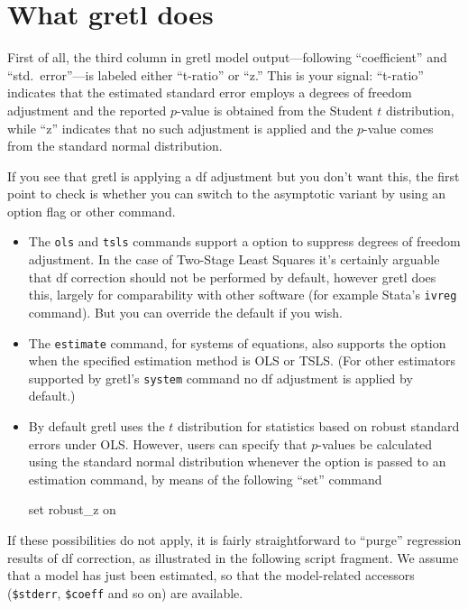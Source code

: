 \section{What gretl does}
\label{sec:df-policy}

First of all, the third column in gretl model output---following
``coefficient'' and ``std.\ error''---is labeled either ``t-ratio'' or
``z.'' This is your signal: ``t-ratio'' indicates that the estimated
standard error employs a degrees of freedom adjustment and the
reported $p$-value is obtained from the Student $t$ distribution,
while ``z'' indicates that no such adjustment is applied and the
$p$-value comes from the standard normal distribution.

If you see that gretl is applying a df adjustment but you don't want
this, the first point to check is whether you can switch to the
asymptotic variant by using an option flag or other command.
\begin{itemize}
\item The \texttt{ols} and \texttt{tsls} commands support a
   option to suppress degrees of freedom
  adjustment. In the case of Two-Stage Least Squares it's certainly
  arguable that df correction should not be performed by default,
  however gretl does this, largely for comparability with other
  software (for example \textsf{Stata}'s \texttt{ivreg} command).  But
  you can override the default if you wish.
\item The \texttt{estimate} command, for systems of equations, also
  supports the  option when the specified
  estimation method is OLS or TSLS. (For other estimators supported by
  gretl's \texttt{system} command no df adjustment is applied by
  default.)
\item By default gretl uses the $t$ distribution for statistics based
  on robust standard errors under OLS. However, users can specify that
  $p$-values be calculated using the standard normal distribution
  whenever the  option is passed to an estimation
  command, by means of the following ``set'' command
%
\begin{code}
set robust_z on
\end{code}
\end{itemize}

If these possibilities do not apply, it is fairly straightforward to
``purge'' regression results of df correction, as illustrated in the
following script fragment. We assume that a model has just been
estimated, so that the model-related accessors
(\verb|$stderr|, \verb|$coeff| and so on) are available.
%

